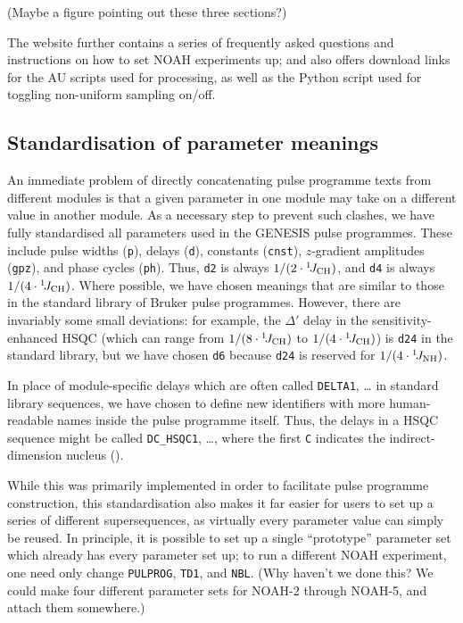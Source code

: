 \documentclass[a4paper,11pt]{article}
\newcommand{\carbon}{\ce{^{13}C}}
\newcommand{\todo}[1]{\textcolor{WildStrawberry}{#1}}
\newcommand{\onejch}{{}^1\!J_{\ce{CH}}}
\newcommand{\onejnh}{{}^1\!J_{\ce{NH}}}
\begin{document}
\todo{(Maybe a figure pointing out these three sections?)}

The website further contains a series of frequently asked questions and instructions on how to set NOAH experiments up; and also offers download links for the AU scripts used for processing, as well as the Python script used for toggling non-uniform sampling on/off.

\subsection{Standardisation of parameter meanings}

An immediate problem of directly concatenating pulse programme texts from different modules is that a given parameter in one module may take on a different value in another module.
As a necessary step to prevent such clashes, we have fully standardised all parameters used in the GENESIS pulse programmes.
These include pulse widths (\texttt{p}), delays (\texttt{d}), constants (\texttt{cnst}), $z$-gradient amplitudes (\texttt{gpz}), and phase cycles (\texttt{ph}).
Thus, \texttt{d2} is always $1 / (2 \cdot \onejch)$, and \texttt{d4} is always $1 / (4 \cdot \onejch)$.
Where possible, we have chosen meanings that are similar to those in the standard library of Bruker pulse programmes.
However, there are invariably some small deviations: for example, the $\Delta'$ delay in the \carbon{} sensitivity-enhanced HSQC (which can range from $1/(8 \cdot\onejch)$ to $1/(4 \cdot\onejch)$) is \texttt{d24} in the standard library, but we have chosen \texttt{d6} because \texttt{d24} is reserved for $1 / (4 \cdot \onejnh)$.

In place of module-specific delays which are often called \texttt{DELTA1}, \ldots{} in standard library sequences, we have chosen to define new identifiers with more human-readable names inside the pulse programme itself.
Thus, the delays in a HSQC sequence might be called \texttt{DC\_HSQC1}, \ldots{}, where the first \texttt{C} indicates the indirect-dimension nucleus (\carbon{}).

While this was primarily implemented in order to facilitate pulse programme construction, this standardisation also makes it far easier for users to set up a series of different supersequences, as virtually every parameter value can simply be reused.
In principle, it is possible to set up a single ``prototype'' parameter set which already has every parameter set up; to run a different NOAH experiment, one need only change \texttt{PULPROG}, \texttt{TD1}, and \texttt{NBL}. \todo{(Why haven't we done this? We could make four different parameter sets for NOAH-2 through NOAH-5, and attach them somewhere.)}
\end{document}
